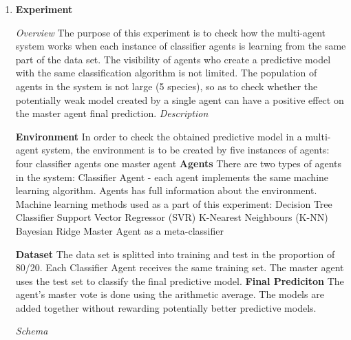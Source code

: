 \newpage
\begin{enumerate}
	\item \textbf{Experiment}

\textit{Overview}
\newline
\quad The purpose of this experiment is to check how the multi-agent system works when each instance of classifier agents is learning from the same part of the data set. The visibility of agents who create a predictive model with the same classification algorithm is not limited. The population of agents in the system is not large (5 species), so as to check whether the potentially weak model created by a single agent can have a positive effect on the master agent final prediction.
\newline \newline
\textit{Description}
\begin{outline}[enumerate]
	\1 \textbf{Environment} \newline
	 In order to check the obtained predictive model in a multi-agent system, the environment is to be created by five instances of agents:
		\2 four classifier agents
		\2 one master agent
	\1 \textbf{Agents}
	\newline
	There are two types of agents in the system:
		\2 Classifier Agent - each agent implements the same machine learning algorithm. Agents has full information about the environment. Machine learning methods used as a part of this experiment:
			\3 Decision Tree Classifier
			\3 Support Vector Regressor (SVR)
			\3 K-Nearest Neighbours (K-NN)
			\3 Bayesian Ridge
		\2 Master Agent as a meta-classifier	 	
		
	\1 \textbf{Dataset}
	\newline
	The data set is splitted into training and test in the proportion of 80/20.
	Each Classifier Agent receives the same training set. The master agent uses the test set to classify the final predictive model.
	\1 \textbf{Final Prediciton}
	\newline
	The agent's master vote is done using the arithmetic average. The models are added together without rewarding potentially better predictive models.
\end{outline}

\textit{Schema}


\end{enumerate}
